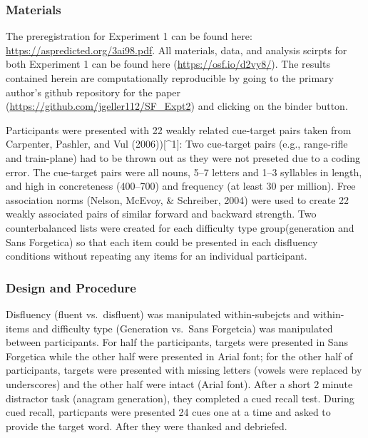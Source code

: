 \documentclass[english,doc]{apa6}
\begin{document}
\hypertarget{materials}{%
\subsubsection{Materials}\label{materials}}

The preregistration for Experiment 1 can be found here: \url{https://aspredicted.org/3ai98.pdf}. All materials, data, and analysis scirpts for both Experiment 1 can be found here (\url{https://osf.io/d2vy8/}). The results contained herein are computationally reproducible by going to the primary author's github repository for the paper (\url{https://github.com/jgeller112/SF_Expt2}) and clicking on the binder button.

Participants were presented with 22 weakly related cue-target pairs taken from Carpenter, Pashler, and Vul (2006)){[}\^{}1{]}: Two cue-target pairs (e.g., range-rifle and train-plane) had to be thrown out as they were not preseted due to a coding error. The cue-target pairs were all nouns, 5--7 letters and 1--3 syllables in length, and high in concreteness (400--700) and frequency (at least 30 per million). Free association norms (Nelson, McEvoy, \& Schreiber, 2004) were used to create 22 weakly associated pairs of similar forward and backward strength. Two counterbalanced lists were created for each difficulty type group(generation and Sans Forgetica) so that each item could be presented in each disfluency conditions without repeating any items for an individual participant.

\hypertarget{design-and-procedure}{%
\subsubsection{Design and Procedure}\label{design-and-procedure}}

Disfluency (fluent vs.~disfluent) was manipulated within-subejcts and within-items and difficulty type (Generation vs.~Sans Forgetcia) was manipulated between participants. For half the participants, targets were presented in Sans Forgetica while the other half were presented in Arial font; for the other half of participants, targets were presented with missing letters (vowels were replaced by underscores) and the other half were intact (Arial font). After a short 2 minute distractor task (anagram generation), they completed a cued recall test. During cued recall, particpants were presented 24 cues one at a time and asked to provide the target word. After they were thanked and debriefed.
\end{document}
